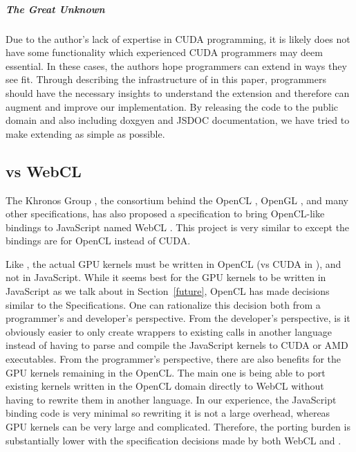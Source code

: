 \subparagraph{The Great Unknown}
Due to the author's lack of expertise in CUDA programming, it is likely \name
does not have some functionality which experienced CUDA programmers may deem
essential. In these cases, the authors hope programmers can extend \name in
ways they see fit. Through describing the infrastructure of \name in this paper,
programmers should have the necessary insights to understand the \name
extension and therefore can augment and improve our implementation. By releasing
the code to the public domain and also including doxgyen and
JSDOC documentation, we have tried to make extending \name as simple as
possible.



\subsection{\name vs WebCL}
\label{webCLDisc}
The Khronos Group \cite{khronos}, the consortium behind the OpenCL
\cite{openCL}, OpenGL \cite{openGL}, and many other specifications, has also
proposed a specification to bring OpenCL-like bindings to JavaScript named WebCL
\cite{webCL}. This project is very similar to \name except the bindings are for
OpenCL instead of CUDA.

Like \namens, the actual GPU kernels must be written in OpenCL (vs CUDA in
\namens), and not in JavaScript. While it seems best for the GPU kernels to be
written in JavaScript as we talk about in Section~\ref{future}, OpenCL has made
decisions similar to the \name Specifications. One can rationalize this decision
both from a programmer's and developer's perspective. From the developer's
perspective, is it obviously easier to only create wrappers to existing calls in
another language instead of having to parse and compile the JavaScript kernels
to CUDA or AMD executables. From the programmer's perspective, there are also
benefits for the GPU kernels remaining in the OpenCL. The main one is being able
to port existing kernels written in the OpenCL domain directly to WebCL without
having to rewrite them in another language. In our experience, the JavaScript
binding code is very minimal so rewriting it is not a large overhead, whereas
GPU kernels can be very large and complicated. Therefore, the porting burden is
substantially lower with the specification decisions made by both WebCL and
\namens.

